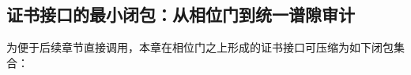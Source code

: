 









\subsection{证书接口的最小闭包：从相位门到统一谱隙审计}\label{subsec:cdim-certificate-interface-closure}
为便于后续章节直接调用，本章在相位门之上形成的证书接口可压缩为如下闭包集合：
